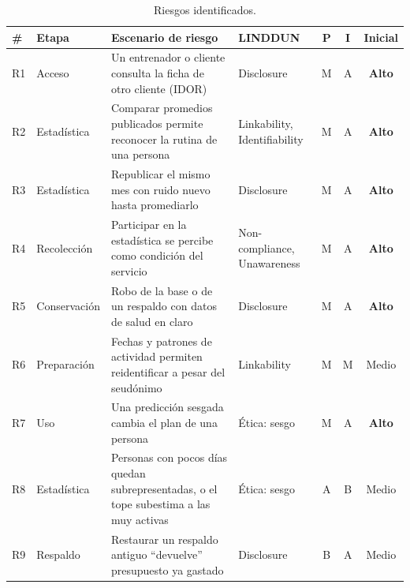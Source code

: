 \documentclass[11pt]{article}
\begin{document}
\begin{table}[H]
\centering\small
\begin{tabularx}{\textwidth}{@{}lp{1.9cm}Yp{2.6cm}ccc@{}}
\toprule
\textbf{\#} & \textbf{Etapa} & \textbf{Escenario de riesgo} & \textbf{LINDDUN} & \textbf{P} & \textbf{I} & \textbf{Inicial} \\
\midrule
R1 & Acceso & Un entrenador o cliente consulta la ficha de otro cliente (IDOR) & Disclosure & M & A & \textbf{Alto} \\
R2 & Estadística & Comparar promedios publicados permite reconocer la rutina de una persona & Linkability, Identifiability & M & A & \textbf{Alto} \\
R3 & Estadística & Republicar el mismo mes con ruido nuevo hasta promediarlo & Disclosure & M & A & \textbf{Alto} \\
R4 & Recolección & Participar en la estadística se percibe como condición del servicio & Non-compliance, Unawareness & M & A & \textbf{Alto} \\
R5 & Conservación & Robo de la base o de un respaldo con datos de salud en claro & Disclosure & M & A & \textbf{Alto} \\
R6 & Preparación & Fechas y patrones de actividad permiten reidentificar a pesar del seudónimo & Linkability & M & M & Medio \\
R7 & Uso & Una predicción sesgada cambia el plan de una persona & Ética: sesgo & M & A & \textbf{Alto} \\
R8 & Estadística & Personas con pocos días quedan subrepresentadas, o el tope subestima a las muy activas & Ética: sesgo & A & B & Medio \\
R9 & Respaldo & Restaurar un respaldo antiguo ``devuelve'' presupuesto ya gastado & Disclosure & B & A & Medio \\
\bottomrule
\end{tabularx}
\caption{Riesgos identificados.}
\end{table}
\end{document}
